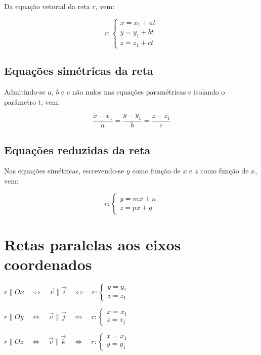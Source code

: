 Da equação vetorial da reta $r$, vem:

$$r:\left\{ \begin{array}{l}
x=x_1+at\\
y=y_1+bt\\
z=z_1+ct \end{array} \right. $$

\subsection{Equações simétricas da reta}

Admitindo-se $a$, $b$ e $c$ não nulos nas equações paramétricas e isolando o parâmetro $t$, vem:

$$\frac{x-x_1}{a}=\frac{y-y_1}{b}=\frac{z-z_1}{c}$$

\subsection{Equações reduzidas da reta}

Nas equações simétricas, escrevendo-se $y$ como função de $x$ e $z$ como função de $x$, vem:

$$r:\left\{ \begin{array}{l}
y=mx+n\\
z=px+q \end{array} \right. $$

\section{Retas paralelas aos eixos coordenados}

$r\parallel Ox \quad\Longleftrightarrow \quad \vec v \parallel \vec i \quad\Longleftrightarrow \quad r:\left\{ \begin{array}{l}
y=y_1\\
z=z_1 \end{array} \right.$

$r\parallel Oy \quad\Longleftrightarrow \quad \vec v \parallel \vec j \quad\Longleftrightarrow \quad r:\left\{ \begin{array}{l}
x=x_1\\
z=z_1 \end{array} \right.$

$r\parallel Oz \quad\Longleftrightarrow \quad \vec v \parallel \vec k \quad\Longleftrightarrow \quad r:\left\{ \begin{array}{l}
x=x_1\\
y=y_1 \end{array} \right.$


